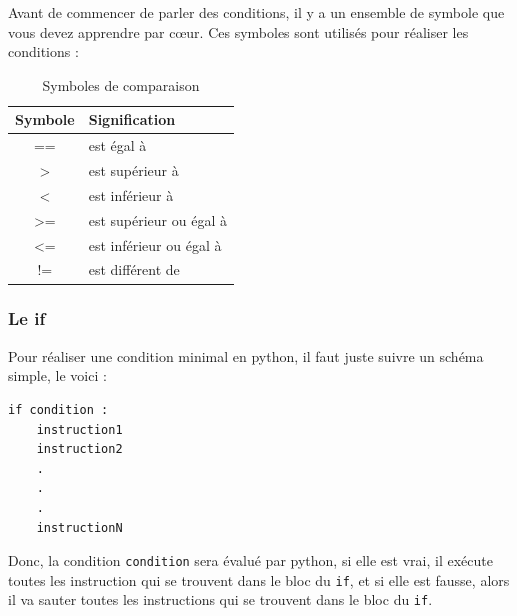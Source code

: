 \documentclass[12pt]{article}
\newcommand{\code}[1]{\colorbox{light-gray}{\texttt{#1}}}
\begin{document}
        Avant de commencer de parler des conditions, il y a un ensemble de symbole que vous devez apprendre par cœur.
        Ces symboles sont utilisés pour réaliser les conditions :

        \begin{table}[h] %

            \centering
            \begin{tabular}{|c|l|}
            \hline
            \textbf{Symbole} & \textbf{Signification} \\
            \hline
            == & est égal à \\
            \hline
            > & est supérieur à \\
            \hline
            < & est inférieur à \\
            \hline
            >= & est supérieur ou égal à \\
            \hline
            <= & est inférieur ou égal à \\
            \hline
            != & est différent de \\
            \hline
            \end{tabular}

            \caption{Symboles de comparaison} %
        \end{table}


        \subsubsection{Le if}
            Pour réaliser une condition minimal en python, il faut juste suivre un schéma simple, le voici :
            \begin{lstlisting}[style=code]
if condition :
    instruction1
    instruction2
    .
    .
    .
    instructionN
            \end{lstlisting}

            Donc, la condition \code{condition} sera évalué par python, si elle est vrai, il exécute toutes les instruction
            qui se trouvent dans le bloc du \code{if}, et si elle est fausse, alors il va sauter toutes les instructions
            qui se trouvent dans le bloc du \code{if}.
\end{document}
